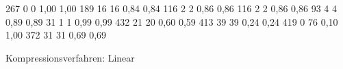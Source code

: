 \begin{table}[p]
\begin{datatabular}
     {267} {0} {0} {1,00} {1,00}
     {189} {16} {16} {0,84} {0,84}
     {116} {2} {2} {0,86} {0,86}
     {116} {2} {2} {0,86} {0,86}
     {93} {4} {4} {0,89} {0,89}
     {31} {1} {1} {0,99} {0,99}
     {432} {21} {20} {0,60} {0,59}
     {413} {39} {39} {0,24} {0,24}
     {419} {0} {76} {0,10} {1,00}
     {372} {31} {31} {0,69} {0,69}
  \end{datatabular}
  \caption{Kompressionsverfahren: Linear}\label{tab:datakomplin}
 \end{table}

